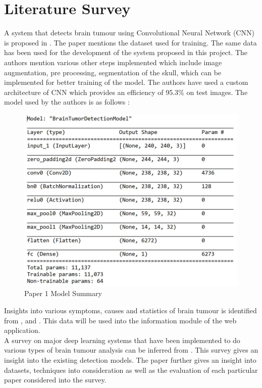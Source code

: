 \chapter{Literature Survey}\par

A system that detects brain tumour using Convolutional Neural Network (CNN) is proposed in \cite{ref1}. The paper mentions the dataset used for training. The same data has been used for the development of the system proposed in this project. The authors mention various other steps implemented which include image augmentation, pre processing, segmentation of the skull, which can be implemented for better training of the model. The authors have used a custom architecture of CNN which provides an efficiency of 95.3\% on test images. The model used by the authors is as follows : 
\begin{figure}[H]
\includegraphics[scale=1]{Photos/paper1_model.PNG}
\caption{Paper 1 Model Summary} \label{fig:ishan}
\end{figure}

Insights into various symptoms, causes and statistics of brain tumour is identified from \cite{ref2} , \cite{ref3} and \cite{ref5}. This data will be used into the information module of the web application.\\ 

A survey on major deep learning systems that have been implemented to do various types of brain tumour analysis can be inferred from \cite{ref4}. This survey gives an insight into the existing detection models. The paper further gives an insight into datasets, techniques into consideration as well as the evaluation of each particular paper considered into the survey.\\

